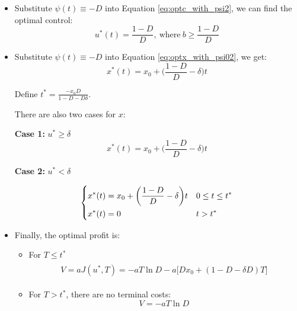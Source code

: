 \begin{itemize}
    \item Substitute $\psi(t)\equiv-D$ into Equation \eqref{eq:optc_with_psi2}, we can find the optimal control:
    \begin{equation}
        u^*(t)=\frac{1-D}{D},\ \text{where}\ b\geq \frac{1-D}{D}
    \end{equation}
    \item Substitute $\psi(t)\equiv-D$ into Equation \eqref{eq:optx_with_psi02}, we get:
    \begin{equation}
        x^*(t)=x_0+\bigg(\frac{1-D}{D}-\delta\bigg)t
    \end{equation}

    Define $t^*=\frac{-x_0D}{1-D-D\delta}$.

    There are also two cases for $x$: 

    {\bf Case 1:} $u^*\geq\delta$
    \begin{equation}
        x^*(t)=x_0+\bigg(\frac{1-D}{D}-\delta\bigg)t
    \end{equation}

    {\bf Case 2:} $u^*<\delta$

    \begin{equation}
        \begin{dcases}
            x^*(t)=x_0+\bigg(\frac{1-D}{D}-\delta\bigg)t & 0\leq t\leq t^*\\
            x^*(t)=0 & t> t^*
        \end{dcases}
    \end{equation}

    \item Finally, the optimal profit is:
    \begin{itemize}
        \item For $T\leq t^*$
        \begin{gather}
            \begin{aligned}
                V=aJ(u^*,T)=-aT\ln D-a\big[Dx_0+(1-D-\delta D)T\big]
            \end{aligned}
        \end{gather}
        \item For $T> t^*$, there are no terminal costs:
        \begin{equation}
            V=-aT\ln D
        \end{equation}
    \end{itemize}

\end{itemize}